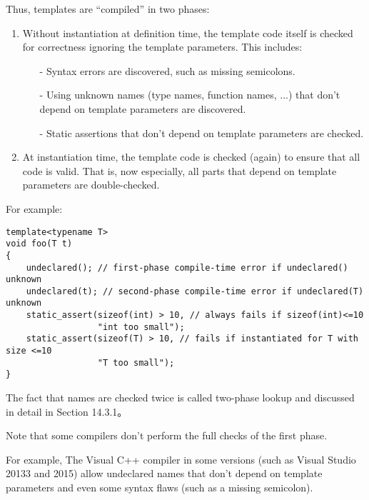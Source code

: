 Thus, templates are “compiled” in two phases:

\begin{enumerate}
\item 
Without instantiation at definition time, the template code itself is checked for correctness ignoring the template parameters. This includes:
\begin{itemize}
\item[-] 
Syntax errors are discovered, such as missing semicolons.

\item[-]
Using unknown names (type names, function names, ...) that don’t depend on template parameters are discovered.

\item[-]
Static assertions that don’t depend on template parameters are checked.
\end{itemize}

\item 
At instantiation time, the template code is checked (again) to ensure that all code is valid. That is, now especially, all parts that depend on template parameters are double-checked.
\end{enumerate}

For example:

\begin{lstlisting}[style=styleCXX]
template<typename T>
void foo(T t)
{
	undeclared(); // first-phase compile-time error if undeclared() unknown
	undeclared(t); // second-phase compile-time error if undeclared(T) unknown
	static_assert(sizeof(int) > 10, // always fails if sizeof(int)<=10
				  "int too small");
	static_assert(sizeof(T) > 10, // fails if instantiated for T with size <=10
	              "T too small");
}
\end{lstlisting}

The fact that names are checked twice is called two-phase lookup and discussed in detail in Section 14.3.1。

Note that some compilers don’t perform the full checks of the first phase.

\begin{tcolorbox}[colback=webgreen!5!white,colframe=webgreen!75!black]
\hspace*{0.75cm}For example, The Visual C++ compiler in some versions (such as Visual Studio 20133 and 2015) allow undeclared names that don’t depend on template parameters and even some syntax flaws (such as a missing semicolon).
\end{tcolorbox}


